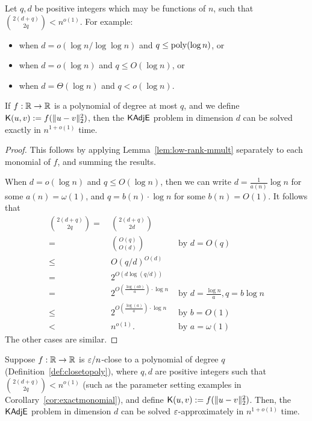 \begin{corollary} \label{cor:exactmonomial}
Let $q,d$ be positive integers which may be functions of $n$, such that $\binom{2(d+q)}{2q} < n^{o(1)}$. For example:
\begin{itemize}
    \item when $d = o(\log n / \log \log n)$ and $q \leq \mathrm{poly} (\log n)$, or
    \item when $d = o(\log n)$ and $q \leq O(\log n)$, or
    \item when $d = \Theta(\log n)$ and $q < o(\log n)$.
\end{itemize}
If $f : {\mathbb R} \to {\mathbb R}$ is a polynomial of degree at most $q$, and we define $\mathsf{K}(u,v) := f(\|u-v\|_2^2)$, then the $\mathsf{KAdjE}$ problem in dimension $d$ can be solved exactly in $n^{1 + o(1)}$ time.
\end{corollary}

\begin{proof}
This follows by applying Lemma~\ref{lem:low-rank-mmult} separately to each monomial of $f$, and summing the results.

When $d = o(\log n)$ and $q \leq O(\log n)$, then we can write $d = \frac{1}{a(n)} \log n$ for some $a(n) = \omega(1)$, and $q = b(n) \cdot \log n$ for some $b(n) = O(1)$. It follows that \begin{align*}
\binom{2(d+q)}{2q} 
= & ~ \binom{2(d+q)}{2d} \\
= & ~ \binom{O(q)}{O(d)} & \text{~by~} d = O(q) \\
\leq & ~ O(q/d)^{O(d)} \\
= & ~ 2^{O(d \log(q/d))} \\
= & ~ 2^{O(\frac{\log(ab)}{a}) \cdot \log n} & \text{~by~} d = \frac{\log n}{a}, q = b \log n \\
\leq & ~ 2^{O(\frac{\log(a)}{a}) \cdot \log n} & \text{~by~} b = O(1) \\
< & ~ n^{o(1)}. & \text{~by~} a = \omega(1)
\end{align*} The other cases are similar.
\end{proof}



\begin{corollary} \label{cor:kernelalg}
Suppose $f : {\mathbb R} \to {\mathbb R}$ is $\varepsilon/n$-close to a polynomial of degree $q$ (Definition~\ref{def:closetopoly}), where $q,d$ are positive integers such that $\binom{2(d+q)}{2q} < n^{o(1)}$ (such as the parameter setting examples in Corollary~\ref{cor:exactmonomial}), and define $\mathsf{K}(u,v) := f(\|u-v\|_2^2)$. Then, the $\mathsf{KAdjE}$ problem in dimension $d$ can be solved $\varepsilon$-approximately in $n^{1 + o(1)}$ time. 
\end{corollary}

